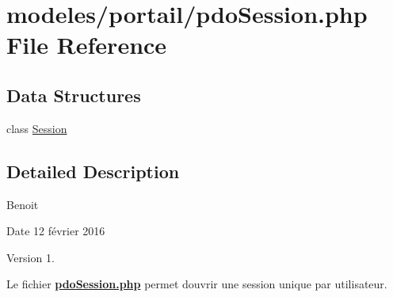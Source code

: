 \hypertarget{pdo_session_8php}{}\section{modeles/portail/pdo\+Session.php File Reference}
\label{pdo_session_8php}
\subsection*{Data Structures}
\begin{DoxyCompactItemize}
\item 
class \hyperlink{class_session}{Session}
\end{DoxyCompactItemize}


\subsection{Detailed Description}
Benoit \begin{DoxyDate}{Date}
12 février 2016 
\end{DoxyDate}
\begin{DoxyVersion}{Version}
1.
\end{DoxyVersion}
Le fichier {\bfseries \hyperlink{pdo_session_8php}{pdo\+Session.\+php}} permet d\textquotesingle{}ouvrir une session unique par utilisateur. 